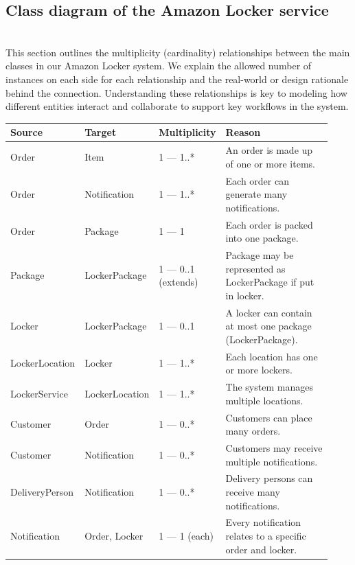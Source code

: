 \subsection{Class diagram of the Amazon Locker service}\label{P-_N0zIaQH4n6ITzuz3AL}
\\
This section outlines the multiplicity (cardinality) relationships between the main classes in our Amazon Locker system. We explain the allowed number of instances on each side for each relationship and the real-world or design rationale behind the connection. Understanding these relationships is key to modeling how different entities interact and collaborate to support key workflows in the system.

\begin{center}
\begin{tabular}{|p{0.18\linewidth}|p{0.18\linewidth}|p{0.12\linewidth}|p{0.45\linewidth}|}
\hline
\textbf{Source} & \textbf{Target} & \textbf{Multiplicity} & \textbf{Reason} \\
\hline
Order & Item & 1 — 1..* & An order is made up of one or more items. \\
\hline
Order & Notification & 1 — 1..* & Each order can generate many notifications. \\
\hline
Order & Package & 1 — 1 & Each order is packed into one package. \\
\hline
Package & LockerPackage & 1 — 0..1 (extends) & Package may be represented as LockerPackage if put in locker. \\
\hline
Locker & LockerPackage & 1 — 0..1 & A locker can contain at most one package (LockerPackage). \\
\hline
LockerLocation & Locker & 1 — 1..* & Each location has one or more lockers. \\
\hline
LockerService & LockerLocation & 1 — 1..* & The system manages multiple locations. \\
\hline
Customer & Order & 1 — 0..* & Customers can place many orders. \\
\hline
Customer & Notification & 1 — 0..* & Customers may receive multiple notifications. \\
\hline
DeliveryPerson & Notification & 1 — 0..* & Delivery persons can receive many notifications. \\
\hline
Notification & Order, Locker & 1 — 1 (each) & Every notification relates to a specific order and locker. \\
\hline
\end{tabular}
\end{center}


